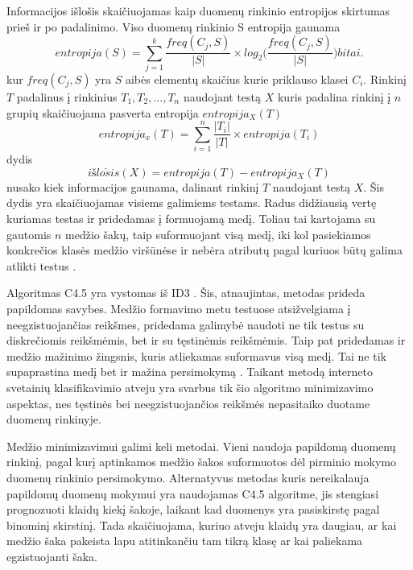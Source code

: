  Informacijos išlošis skaičiuojamas kaip duomenų rinkinio entropijos skirtumas prieš ir po padalinimo. Viso duomenų rinkinio S entropija gaunama \cite{c45}
\begin{equation}\label{eq:entropija}
entropija(S) = \sum_{j=1}^{k} \frac{freq(C_j, S)}{|S|} \times log_2\Big(\frac{freq(C_j, S)}{|S|}\Big)  bitai.
\end{equation}
kur $freq(C_j, S)$ yra $S$ aibės elementų skaičius kurie priklauso klasei $C_i$. Rinkinį $T$ padalinus į rinkinius $T_1, T_2, ... , T_n$ naudojant testą $X$ kuris padalina rinkinį į $n$ grupių skaičiuojama pasverta entropija $entropija_X(T)$ \cite{c45}
\begin{equation}\label{eq:entropija_x}
entropija_x(T) = \sum_{i=1}^{n} \frac{|T_i|}{|T|} \times entropija(T_i)
\end{equation}
dydis
\begin{equation}\label{eq:išlošis}
    išlo \check sis(X) = entropija(T) - entropija_X(T)
\end{equation}
nusako kiek informacijos gaunama, dalinant rinkinį $T$ naudojant testą $X$. Šis dydis yra skaičiuojamas visiems galimiems testams. Radus didžiausią vertę kuriamas testas ir pridedamas į formuojamą medį. Toliau tai kartojama su gautomis $n$ medžio šakų, taip suformuojant visą medį, iki kol pasiekiamos konkrečios klasės medžio viršūnėse ir nebėra atributų pagal kuriuos būtų galima atlikti testus \cite{c45}.

Algoritmas C4.5 yra vystomas iš ID3 \cite{Wu2008}. Šis, atnaujintas, metodas prideda papildomas savybes. Medžio formavimo metu testuose atsižvelgiama į neegzistuojančias reikšmes, pridedama galimybė naudoti ne tik testus su diskrečiomis reikšmėmis, bet ir su tęstinėmis reikšmėmis. Taip pat pridedamas ir medžio mažinimo žingsnis, kuris atliekamas suformavus visą medį. Tai ne tik supaprastina medį bet ir mažina persimokymą \cite{c45}. Taikant metodą interneto svetainių klasifikavimio atveju yra svarbus tik šio algoritmo minimizavimo aspektas, nes tęstinės bei neegzistuojančios reikšmės nepasitaiko duotame duomenų rinkinyje.

Medžio minimizavimui galimi keli metodai. Vieni naudoja papildomą duomenų rinkinį, pagal kurį aptinkamos medžio šakos suformuotos dėl pirminio mokymo duomenų rinkinio persimokymo. Alternatyvus metodas kuris nereikalauja papildomų duomenų mokymui yra naudojamas C4.5 algoritme, jis stengiasi prognozuoti klaidų kiekį šakoje, laikant kad duomenys yra pasiskirstę pagal binominį skirstinį. Tada skaičiuojama, kuriuo atveju klaidų yra daugiau, ar kai medžio šaka pakeista lapu atitinkančiu tam tikrą klasę ar kai paliekama egzistuojanti šaka.

